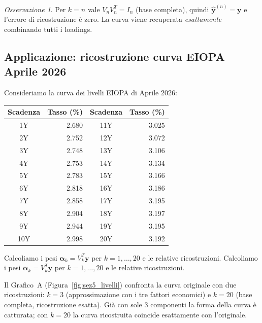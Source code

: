 \documentclass[11pt,a4paper]{article}
\theoremstyle{plain}
\theoremstyle{definition}
\theoremstyle{remark}
\newtheorem*{osservazione}{Osservazione}
\begin{document}
\begin{osservazione}
Per $k = n$ vale $V_n V_n^T = I_n$ (base completa), quindi
$\hat{\mathbf{y}}^{(n)} = \mathbf{y}$ e l'errore di ricostruzione è zero.
La curva viene recuperata \emph{esattamente} combinando tutti i loadings.
\end{osservazione}

\subsection{Applicazione: ricostruzione curva EIOPA Aprile 2026}

Consideriamo la curva dei livelli EIOPA di Aprile 2026:
\begin{center}
\small
\renewcommand{\arraystretch}{1.15}
\begin{tabular}{cr @{\hspace{2em}} cr}
\toprule
Scadenza & \multicolumn{1}{c}{Tasso (\%)} & Scadenza & \multicolumn{1}{c}{Tasso (\%)} \\
\midrule
 1Y & 2.680 & 11Y & 3.025 \\
 2Y & 2.752 & 12Y & 3.072 \\
 3Y & 2.748 & 13Y & 3.106 \\
 4Y & 2.753 & 14Y & 3.134 \\
 5Y & 2.783 & 15Y & 3.166 \\
 6Y & 2.818 & 16Y & 3.186 \\
 7Y & 2.858 & 17Y & 3.195 \\
 8Y & 2.904 & 18Y & 3.197 \\
 9Y & 2.944 & 19Y & 3.195 \\
10Y & 2.998 & 20Y & 3.192 \\
\bottomrule
\end{tabular}
\end{center}

\noindent Calcoliamo i pesi $\boldsymbol{\alpha}_k = V_k^T\mathbf{y}$ per $k = 1, \ldots, 20$
e le relative ricostruzioni.
Calcoliamo i pesi $\boldsymbol{\alpha}_k = V_k^T\mathbf{y}$ per $k = 1, \ldots, 20$
e le relative ricostruzioni.

Il Grafico~A (Figura~\ref{fig:sez5_livelli}) confronta la curva originale
con due ricostruzioni: $k = 3$ (approssimazione con i tre fattori economici)
e $k = 20$ (base completa, ricostruzione esatta). Già con sole 3 componenti
la forma della curva è catturata; con $k = 20$ la curva ricostruita
coincide esattamente con l'originale.
\end{document}
